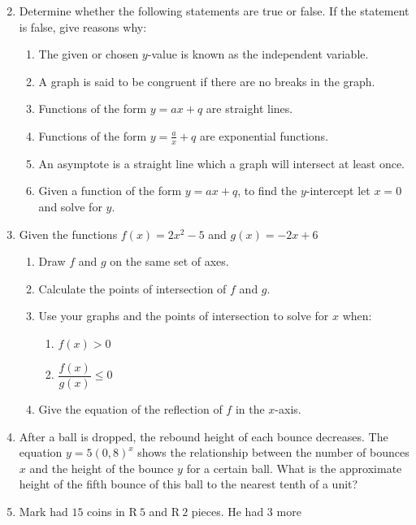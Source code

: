 \begin{eocexercises}{}
\begin{enumerate}[itemsep=9pt, label=\textbf{\arabic*}. ]
\begin{multicols}{3}
\begin{enumerate}[noitemsep, label=\textbf{(\alph*)} ]
    \end{enumerate}
\end{multicols}
  \item Determine whether the following statements are true or false. If the statement is false, give reasons why:
    \begin{enumerate}[noitemsep, label=\textbf{(\alph*)} ] %
    \item The given or chosen $y$-value is known as the independent variable.
    \item A graph is said to be congruent if there are no breaks in the graph.
    \item Functions of the form $y=ax+q$ are straight lines.
    \item Functions of the form $y=\frac{a}{x}+q$ are exponential functions.
    \item  An asymptote is a straight line which a graph will intersect at least once.
    \item Given a function of the form $y=ax+q$, to find the $y$-intercept let $x=0$ and solve for $y$.
    \end{enumerate}
  \item Given the functions $f(x)=2{x}^{2}-5$ and $g(x)=-2x+6$
    \begin{enumerate}[noitemsep, label=\textbf{(\alph*)} ] %
    \item Draw $f$ and $g$ on the same set of axes.
    \item Calculate the points of intersection of $f$ and $g$.
    \item Use your graphs and the points of intersection to solve for $x$ when:
      \begin{enumerate}[itemsep=3pt, label=\textbf{\roman*}. ] %
      \item $f(x)>0$
      \item $\dfrac{f(x)}{g(x)}\leq 0$
      \end{enumerate}
    \item Give the equation of the reflection of $f$ in the $x$-axis.
    \end{enumerate}
  \item After a ball is dropped, the rebound height of each bounce
    decreases. The equation $y=5{(0,8)}^{x}$ shows the relationship
    between the number of bounces $x$ and the height of the bounce $y$
    for a certain ball.  What is the approximate height of the fifth
    bounce of this ball to the nearest tenth of a unit?
  \item Mark had $15$ coins in R$~5$ and R$~2$ pieces. He had $3$ more

\end{enumerate}
\end{eocexercises}
